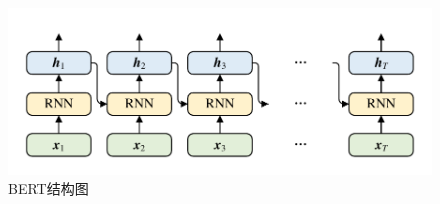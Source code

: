 \begin{figure}[htb]
	\centering
	\includegraphics[page=9, width=0.25\linewidth]{images/structure.pdf}
	\caption{BERT结构图}
	\label{fig:BERT}
\end{figure}